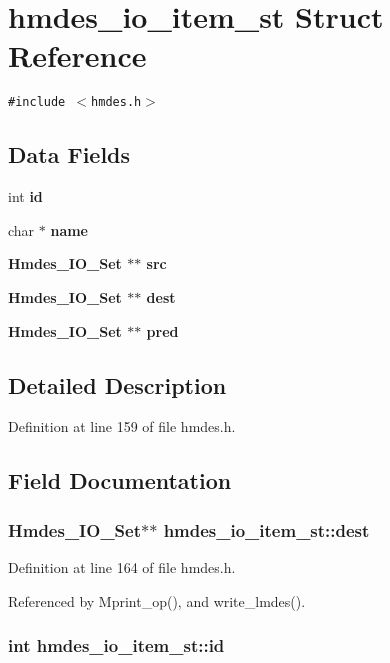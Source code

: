 \section{hmdes\_\-io\_\-item\_\-st Struct Reference}
\label{structhmdes__io__item__st}
{\tt \#include $<$hmdes.h$>$}

\subsection*{Data Fields}
\begin{CompactItemize}
\item 
int \bf{id}
\item 
char $\ast$ \bf{name}
\item 
\bf{Hmdes\_\-IO\_\-Set} $\ast$$\ast$ \bf{src}
\item 
\bf{Hmdes\_\-IO\_\-Set} $\ast$$\ast$ \bf{dest}
\item 
\bf{Hmdes\_\-IO\_\-Set} $\ast$$\ast$ \bf{pred}
\end{CompactItemize}


\subsection{Detailed Description}




Definition at line 159 of file hmdes.h.

\subsection{Field Documentation}
\subsubsection{\setlength{\rightskip}{0pt plus 5cm}\bf{Hmdes\_\-IO\_\-Set}$\ast$$\ast$ \bf{hmdes\_\-io\_\-item\_\-st::dest}}\label{structhmdes__io__item__st_99e8bb66e9a127e08832eab0393be549}




Definition at line 164 of file hmdes.h.

Referenced by Mprint\_\-op(), and write\_\-lmdes().
\subsubsection{\setlength{\rightskip}{0pt plus 5cm}int \bf{hmdes\_\-io\_\-item\_\-st::id}}\label{structhmdes__io__item__st_0ffc247e32ee8131b4840bab2a822989}





